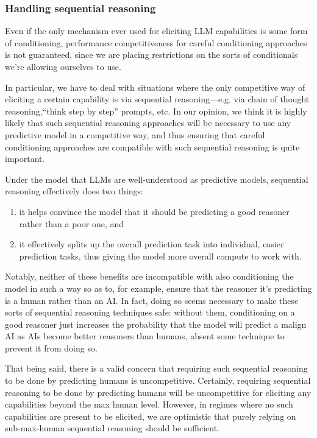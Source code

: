 \documentclass[
  onecolumn,
  nonatbib,
]{miri-tech-article}
\begin{document}
\subsubsection{Handling sequential reasoning}\label{subsubsec:handling_sequential_reasoning}

Even if the only mechanism ever used for eliciting LLM capabilities is some form of conditioning, performance competitiveness for careful conditioning approaches is not guaranteed, since we are placing restrictions on the sorts of conditionals we're allowing ourselves to use.

In particular, we have to deal with situations where the only competitive way of eliciting a certain capability is via sequential reasoning---e.g. via chain of thought reasoning,``think step by step\cite{kojima_large_2023}'' prompts, etc. In our opinion, we think it is highly likely that such sequential reasoning approaches will be necessary to use any predictive model in a competitive way, and thus ensuring that careful conditioning approaches are compatible with such sequential reasoning is quite important.

Under the model that LLMs are well-understood as predictive models, sequential reasoning effectively does two things:



\begin{enumerate}
\item it helps convince the model that it should be predicting a good reasoner rather than a poor one, and
\item it effectively splits up the overall prediction task into individual, easier prediction tasks, thus giving the model more overall compute to work with.
\end{enumerate}

Notably, neither of these benefits are incompatible with also conditioning the model in such a way so as to, for example, ensure that the reasoner it's predicting is a human rather than an AI. In fact, doing so seems necessary to make these sorts of sequential reasoning techniques safe: without them, conditioning on a good reasoner just increases the probability that the model will predict a malign AI as AIs become better reasoners than humans, absent some technique to prevent it from doing so.

That being said, there is a valid concern that requiring such sequential reasoning to be done by predicting humans is uncompetitive. Certainly, requiring sequential reasoning to be done by predicting humans will be uncompetitive for eliciting any capabilities beyond the max human level. However, in regimes where no such capabilities are present to be elicited, we are optimistic that purely relying on sub-max-human sequential reasoning should be sufficient.
\end{document}
